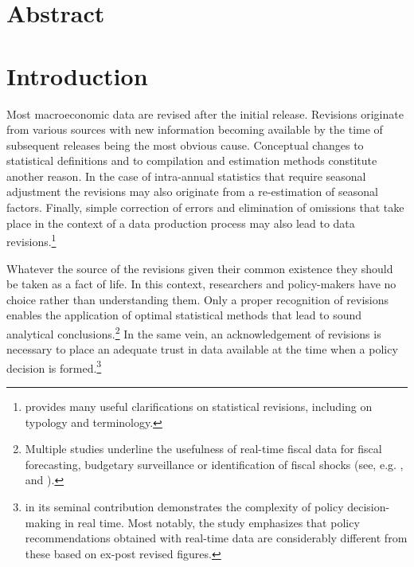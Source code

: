 \documentclass[
  letterpaper,
  authoryear,
  preprint,
  3p]{elsarticle}
\begin{document}
\hypertarget{abstract}{%
\chapter*{Abstract}\label{abstract}}



\hypertarget{introduction}{%
\chapter{Introduction}\label{introduction}}

Most macroeconomic data are revised after the initial release. Revisions
originate from various sources with new information becoming available
by the time of subsequent releases being the most obvious cause.
Conceptual changes to statistical definitions and to compilation and
estimation methods constitute another reason. In the case of
intra-annual statistics that require seasonal adjustment the revisions
may also originate from a re-estimation of seasonal factors. Finally,
simple correction of errors and elimination of omissions that take place
in the context of a data production process may also lead to data
revisions.\footnote{\citet{carson2004imf} provides many useful
  clarifications on statistical revisions, including on typology and
  terminology.}

Whatever the source of the revisions given their common existence they
should be taken as a fact of life. In this context, researchers and
policy-makers have no choice rather than understanding them. Only a
proper recognition of revisions enables the application of optimal
statistical methods that lead to sound analytical
conclusions.\footnote{Multiple studies underline the usefulness of
  real-time fiscal data for fiscal forecasting, budgetary surveillance
  or identification of fiscal shocks (see, e.g.
  \citet{Pedegral-Perez_2009_JIF}, \citet{Asimakopoulosetal2020_sje} and
  \citet{Cimadomo_2016_jes}).} In the same vein, an acknowledgement of
revisions is necessary to place an adequate trust in data available at
the time when a policy decision is formed.\footnote{\citet{Orphanides_2001_AER}
  in its seminal contribution demonstrates the complexity of policy
  decision-making in real time. Most notably, the study emphasizes that
  policy recommendations obtained with real-time data are considerably
  different from these based on ex-post revised figures.}
\end{document}
